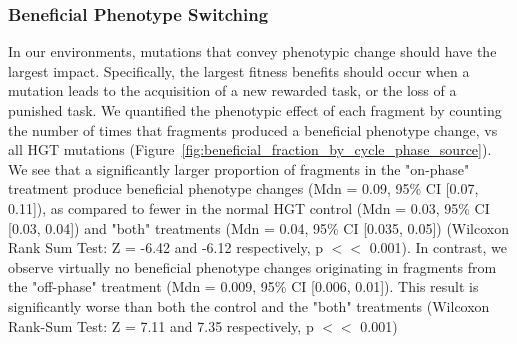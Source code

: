 \documentclass[PhD]{msu-thesis}
\begin{document}
\subsubsection{Beneficial Phenotype Switching}
In our environments, mutations that convey phenotypic change should have the largest impact. Specifically, the largest fitness benefits should occur when a mutation leads to the acquisition of a new rewarded task, or the loss of a punished task.  
We quantified 
the phenotypic effect of each fragment by counting the number of times that fragments produced a beneficial phenotype change, vs all HGT mutations (Figure~\ref{fig:beneficial_fraction_by_cycle_phase_source}). We see that a significantly larger proportion of fragments in the "on-phase" treatment produce beneficial phenotype changes (Mdn = 0.09, 95\% CI [0.07, 0.11]), as compared to fewer in the normal HGT control (Mdn = 0.03, 95\% CI [0.03, 0.04]) and "both" treatments (Mdn = 0.04, 95\% CI [0.035, 0.05]) (Wilcoxon Rank Sum Test: Z = -6.42 and -6.12 respectively, p $<<$ 0.001). In contrast, we observe virtually no beneficial phenotype changes originating in fragments from the "off-phase" treatment (Mdn = 0.009, 95\% CI [0.006, 0.01]). This result is significantly worse than both the control and the "both" treatments (Wilcoxon Rank-Sum Test: Z = 7.11 and 7.35 respectively, p $<<$ 0.001) 
\end{document}

